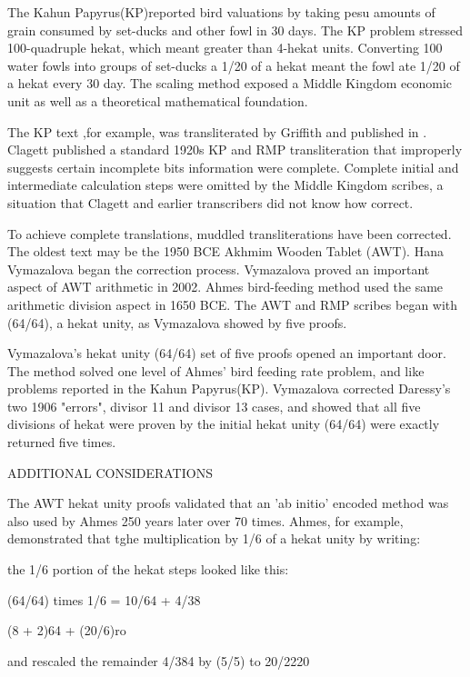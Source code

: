\documentclass[12pt]{article}
\begin{document}
The Kahun Papyrus(KP)reported bird valuations by taking pesu amounts of grain consumed by set-ducks and other fowl in 30 days. The KP problem stressed 100-quadruple hekat, which meant greater than 4-hekat units. Converting 100 water fowls into groups of set-ducks a 1/20 of a hekat meant the fowl ate 1/20 of a hekat every 30 day. The scaling method exposed a Middle Kingdom economic unit as well as a theoretical mathematical foundation.

The KP text ,for example, was transliterated by Griffith and published in . Clagett published a standard 1920s KP and RMP transliteration that improperly suggests certain incomplete bits information were complete. Complete initial and intermediate calculation steps were omitted by the Middle Kingdom scribes, a situation that Clagett and earlier transcribers did not know how correct.

To achieve complete translations, muddled transliterations have been corrected. The oldest text may be the 1950 BCE Akhmim Wooden Tablet (AWT). Hana Vymazalova began the correction process. Vymazalova proved an important aspect of AWT arithmetic in 2002. Ahmes bird-feeding method used the same arithmetic division aspect in 1650 BCE. The AWT and RMP scribes began with (64/64), a hekat unity, as Vymazalova showed by five proofs. 

Vymazalova's hekat unity (64/64) set of five proofs opened an important door. The method solved one level of Ahmes' bird feeding rate problem, and like problems reported in the Kahun Papyrus(KP). Vymazalova  corrected  Daressy's two 1906 "errors", divisor 11 and divisor 13 cases, and showed that all five divisions of hekat were proven by the initial  hekat unity (64/64) were exactly returned five times.

ADDITIONAL CONSIDERATIONS
 
The AWT hekat unity proofs validated that an 'ab initio' encoded method was also used by Ahmes 250 years later over 70 times. Ahmes, for example, demonstrated that tghe multiplication by 1/6 of a hekat unity by writing:

the 1/6 portion of the hekat steps looked like this:

(64/64) times 1/6 = 10/64 + 4/38

(8 + 2)64 + (20/6)ro

and rescaled the remainder 4/384 by (5/5) to 20/2220
\end{document}
